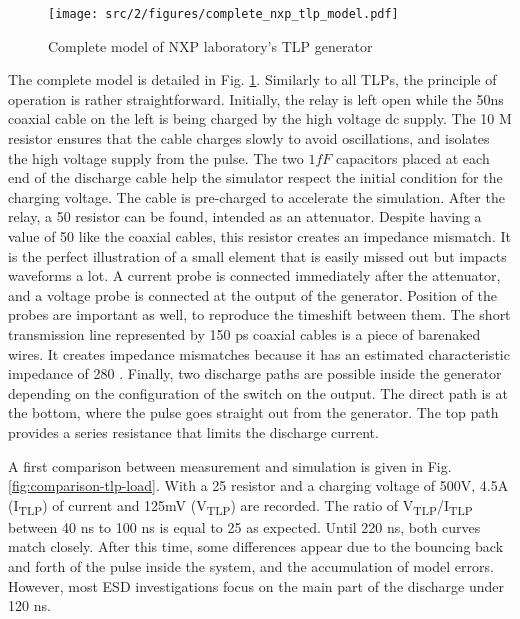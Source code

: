 \begin{figure}[!h]
  \centering
  \texttt{[image: src/2/figures/complete\_nxp\_tlp\_model.pdf]}
  \caption{Complete model of NXP laboratory's TLP generator}
  \label{fig:complete-tlp-model}
\end{figure}

The complete model is detailed in Fig. \ref{fig:complete-tlp-model}.
Similarly to all TLPs, the principle of operation is rather straightforward.
Initially, the relay is left open while the 50ns coaxial cable on the left is being charged by the high voltage \gls{dc} supply.
The 10 M\textOmega{} resistor ensures that the cable charges slowly to avoid oscillations, and isolates the high voltage supply from the pulse.
The two $1 fF$ capacitors placed at each end of the discharge cable help the simulator respect the initial condition for the charging voltage.
The cable is pre-charged to accelerate the simulation.
After the relay, a 50 \textOmega{} resistor can be found, intended as an attenuator.
Despite having a value of 50\textOmega{} like the coaxial cables, this resistor creates an impedance mismatch.
It is the perfect illustration of a small element that is easily missed out but impacts waveforms a lot.
A current probe is connected immediately after the attenuator, and a voltage probe is connected at the output of the generator.
Position of the probes are important as well, to reproduce the timeshift between them.
The short transmission line represented by 150 ps coaxial cables is a piece of barenaked wires.
It creates impedance mismatches because it has an estimated characteristic impedance of 280 \textOmega{}.
Finally, two discharge paths are possible inside the generator depending on the configuration of the switch on the output.
The direct path is at the bottom, where the pulse goes straight out from the generator.
The top path provides a series resistance that limits the discharge current.

A first comparison between measurement and simulation is given in Fig. \ref{fig:comparison-tlp-load}.
With a 25\textOmega{} resistor and a charging voltage of 500V, 4.5A (I\textsubscript{TLP}) of current and 125mV (V\textsubscript{TLP}) are recorded.
The ratio of V\textsubscript{TLP}/I\textsubscript{TLP} between 40 ns to 100 ns is equal to 25\textOmega{} as expected.
Until 220 ns, both curves match closely.
After this time, some differences appear due to the bouncing back and forth of the pulse inside the system, and the accumulation of model errors.
However, most ESD investigations focus on the main part of the discharge under 120 ns.

